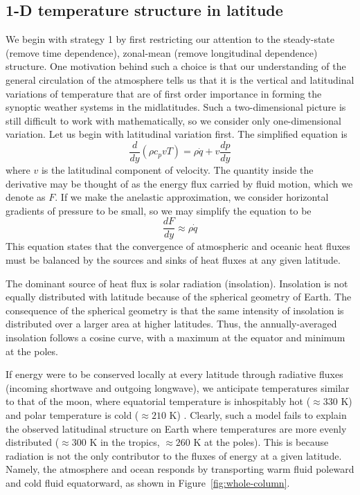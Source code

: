 \documentclass{article}
\begin{document}
\subsection{1-D temperature structure in latitude} 

We begin with strategy 1 by first restricting our attention to the steady-state (remove time dependence), zonal-mean (remove longitudinal dependence) structure. One motivation behind such a choice is that our understanding of the general circulation of the atmosphere tells us that it is the vertical and latitudinal variations of temperature that are of first order importance in forming the synoptic weather systems in the midlatitudes. Such a two-dimensional picture is still difficult to work with mathematically, so we consider only one-dimensional variation. Let us begin with latitudinal variation first. The simplified equation is
\begin{equation}
\frac{d}{dy}(\rho c_p v T) = \rho \dot{q} + v \frac{dp}{dy}
\end{equation}
where $v$ is the latitudinal component of velocity. The quantity inside the derivative may be thought of as the energy flux carried by fluid motion, which we denote as $F$. If we make the anelastic approximation, we consider horizontal gradients of pressure to be small, so we may simplify the equation to be
\begin{equation}
\frac{dF}{dy} \approx \rho \dot{q} 
\end{equation}
This equation states that the convergence of atmospheric and oceanic heat fluxes must be balanced by the sources and sinks of heat fluxes at any given latitude.

The dominant source of heat flux is solar radiation (insolation). Insolation is not equally distributed with latitude because of the spherical geometry of Earth. The consequence of the spherical geometry is that the same intensity of insolation is distributed over a larger area at higher latitudes. Thus, the annually-averaged insolation follows a cosine curve, with a maximum at the equator and minimum at the poles.

If energy were to be conserved locally at every latitude through radiative fluxes (incoming shortwave and outgoing longwave), we anticipate temperatures similar to that of the moon, where equatorial temperature is inhospitably hot ($\approx 330$ K) and polar temperature is cold ($\approx 210$ K) \citep{north-et-al-1981}. Clearly, such a model fails to explain the observed latitudinal structure on Earth where temperatures are more evenly distributed ($\approx 300$ K in the tropics, $\approx 260$ K at the poles). This is because radiation is not the only contributor to the fluxes of energy at a given latitude. Namely, the atmosphere and ocean responds by transporting warm fluid poleward and cold fluid equatorward, as shown in Figure~\ref{fig:whole-column}.
\end{document}
